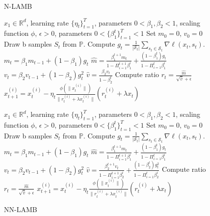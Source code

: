 \documentclass{article} \usepackage{iclr2020_conference,times}
\begin{document}
\begin{figure}
\begin{minipage}[b]{.48\textwidth}

\begin{algorithm}[H]\small
	\caption{N-LAMB}
	\label{alg:nlamb}
	\begin{algorithmic}
		 $x_1 \in \mathbb{R}^d$, learning rate $\{\eta_t\}_{t=1}^T$,  parameters $0 < \beta_{1}, \beta_2 < 1$, scaling function $\phi$, $\epsilon > 0$, parameters $0 < \{\beta_{1}^t\}_{t=1}^T < 1$
		\STATE Set $m_{0} = 0$, $v_{0} = 0$
		\STATE Draw b samples $S_t$ from $\mathbb{P}$.
        \STATE Compute $g_t = \frac{1}{|\mathcal{S}_t|} \sum_{s_t \in \mathcal{S}_t}\nabla \ell(x_t, s_t)$.
\STATE  $m_{t} = \beta_{1} m_{t-1} + (1 - \beta_{1}) g_{t}$ 
		\STATE $\hat{m} = \frac{\beta_{1}^{t+1} m_t}{1 - {\Pi}_{i=1}^{t+1} \beta_{1}^i} + \frac{(1 - \beta_{1}^{t}) g_t}{1 - {\Pi}_{i=1}^{t} \beta_{1}^i}$
		\STATE  $v_{t} = \beta_{2} v_{t-1} + (1 - \beta_{2}) g_{t}^2$
		\STATE $\hat{v} = \frac{\beta_2 v_t}{1 - {\beta}_2^t}$
		\STATE Compute ratio $r_t = \frac{\hat{m}}{\sqrt{\hat{v}} + \epsilon}$
		\STATE $x_{t+1}^{(i)} = x_{t}^{(i)} - \eta_t \frac{\phi(\|x_t^{(i)}\|)}{\|r_t^{(i)} + \lambda x_t^{(i)}\|} (r_t^{(i)} + \lambda x_t)$
		\ENDFOR
	\end{algorithmic}
\end{algorithm}

\end{minipage}\hfill \begin{minipage}[b]{.5\textwidth}

\begin{algorithm}[H]\small
	\caption{NN-LAMB}
	\label{alg:nnlamb}
	\begin{algorithmic}
		 $x_1 \in \mathbb{R}^d$, learning rate $\{\eta_t\}_{t=1}^T$,  parameters $0 < \beta_{1}, \beta_2 < 1$, scaling function $\phi$, $\epsilon > 0$, parameters $0 < \{\beta_{1}^t\}_{t=1}^T < 1$
		\STATE Set $m_{0} = 0$, $v_{0} = 0$
		\FOR{$t=1$ {\bf to} $T$}
		\STATE Draw b samples $S_t$ from $\mathbb{P}$.
        \STATE Compute $g_t = \frac{1}{|\mathcal{S}_t|} \sum_{s_t \in \mathcal{S}_t}\nabla \ell(x_t, s_t)$.
\STATE  $m_{t} = \beta_{1} m_{t-1} + (1 - \beta_{1}) g_{t}$ 
		\STATE $\hat{m} = \frac{\beta_{1}^{t+1} m_t}{1 - {\Pi}_{i=1}^{t+1} \beta_{1}^i} + \frac{(1 - \beta_{1}^{t}) g_t}{1 - {\Pi}_{i=1}^{t} \beta_{1}^i}$
		\STATE  $v_{t} = \beta_{2} v_{t-1} + (1 - \beta_{2}) g_{t}^2$
\STATE $\hat{v} = \frac{\beta_{2}^{t+1} v_t}{1 - {\Pi}_{i=1}^{t+1} \beta_{2}^i} + \frac{(1 - \beta_{2}^{t}) g_{t}^2}{1 - {\Pi}_{i=1}^{t} \beta_{2}^i}$
		\STATE Compute ratio $r_t = \frac{\hat{m}}{\sqrt{\hat{v}} + \epsilon}$
		\STATE $x_{t+1}^{(i)} = x_{t}^{(i)} - \eta_t \frac{\phi(\|x_t^{(i)}\|)}{\|r_t^{(i)} + \lambda x_t^{(i)}\|} (r_t^{(i)} + \lambda x_t)$
		\ENDFOR
	\end{algorithmic}
\end{algorithm}

\end{minipage}
\end{figure}
\end{document}
